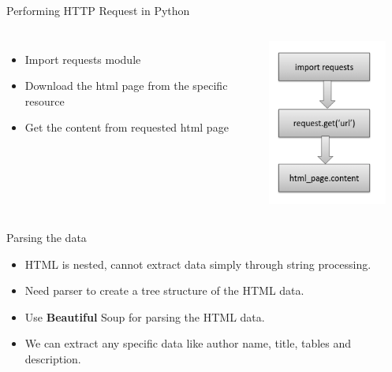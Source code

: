 \documentclass[aspectratio=169,12pt]{beamer}
\begin{document}
\begin{frame}{Performing HTTP Request in Python}
\begin{columns}

\begin{itemize}
\itemsep1em
 
\item Import requests module
\item Download the html page from the specific resource 
\item Get the content from requested html page
\end{itemize}
	\begin{flushright}
		\includegraphics[width=6cm,  height=5.5cm]{Images/AIML_WS_IMG2.png}
	\end{flushright}

\end{columns}
\end{frame}


\begin{frame}[t]{Parsing the data}
\begin{itemize}
\itemsep2em 
\item HTML is nested, cannot extract data simply through string processing.
\item Need parser to create a tree structure of the HTML data. 
\item  Use \textbf{Beautiful} Soup for parsing the HTML data.
\item We can extract any specific data like author name, title, tables and description.
\end{itemize}
\end{frame}
\end{document}
